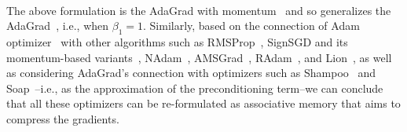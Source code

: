 \documentclass{article}
\newcommand{\citep}{\parencite}
\begin{document}
{\begin{align}
\end{align}
The above formulation is the AdaGrad with momentum~\citep{defossez2022a} and so generalizes the AdaGrad~\citep{duchi2011adaptive}, i.e., when $\beta_1 = 1$. Similarly, based on the connection of Adam optimizer~\citep{kingma2014adam} with other algorithms such as RMSProp~\citep{hinton2012neural}, SignSGD and its momentum-based variants~\citep{bernstein2018signsgd}, NAdam~\citep{dozat2016incorporating}, AMSGrad~\citep{reddi2016stochastic}, RAdam~\citep{Liu2020On}, and Lion~\citep{chen2023symbolic}, as well as considering AdaGrad's connection with optimizers such as Shampoo~\citep{gupta2018shampoo} and Soap~\citep{vyas2025soap}–i.e., as the approximation of the preconditioning term–we can conclude that all these optimizers can be re-formulated as associative memory that aims to compress the gradients. 

}
\end{document}
